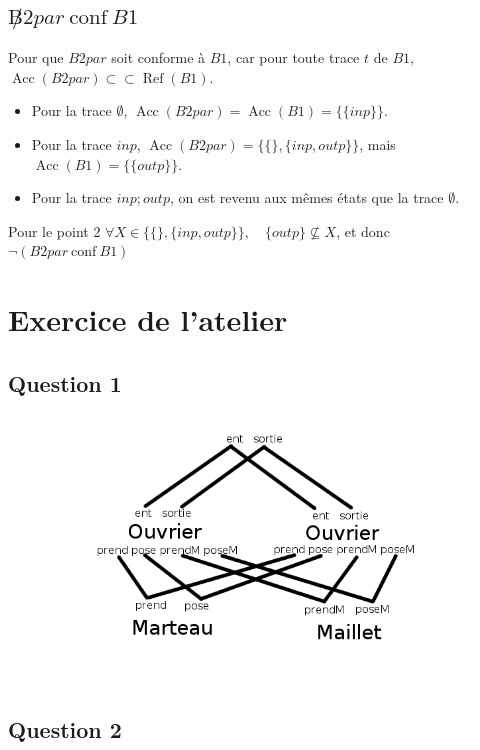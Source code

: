 \documentclass[a4paper,french,12pt]{article}
\def\conf{\ \text{conf}\ }
\DeclareMathOperator{\Acc}{Acc}
\DeclareMathOperator{\Ref}{Ref}
\begin{document}
\subsection{$\not B2par \conf B1$}

Pour que $B2par$ soit conforme à $B1$, car pour toute trace $t$ de $B1$,
$\Acc(B2par) \subset\subset \Ref(B1)$.

\begin{itemize}
\item Pour la trace $\emptyset$, $\Acc(B2par) = \Acc(B1) = \{\{inp\}\}$.
\item Pour la trace $inp$, $\Acc(B2par) = \{\{\}, \{inp,outp\}\}$, mais $\Acc(B1) = \{\{outp\}\}$.
\item Pour la trace $inp;outp$, on est revenu aux mêmes états que la trace $\emptyset$.
\end{itemize}
Pour le point 2 $\forall X \in \{\{\}, \{inp,outp\}\},\quad \{outp\} \not\subseteq X$, et donc $\neg(B2par \conf B1)$

\section{Exercice de l'atelier}

\subsection{Question 1}

\begin{figure}[h]
  \centering
  \includegraphics[width=15cm]{question1}
\end{figure}

\subsection{Question 2}
\end{document}
